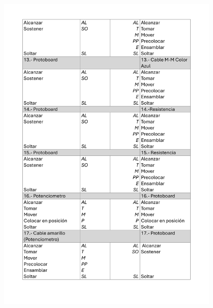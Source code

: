     \begin{figure}[H]
        \centering
        \includegraphics[scale=0.25]{30/img/diagramaBimanualEnsamble-3.pdf}
    \end{figure}
